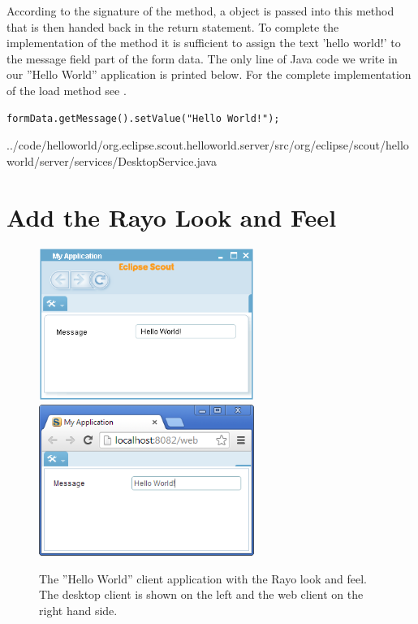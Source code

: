\documentclass[a4paper,10pt,twoside]{book}
\begin{document}
According to the signature of the  method, a  object is passed into this method that is then handed back in the return statement.
To complete the implementation of the  method it is sufficient to assign the text 'hello world!' to the message field part of the form data.
The only line of Java code we write in our ''Hello World'' application is printed below.
For the complete implementation of the load method see .

\begin{lstlisting}[backgroundcolor=\color{white}]
  formData.getMessage().setValue("Hello World!");
\end{lstlisting}


{../code/helloworld/org.eclipse.scout.helloworld.server/src/org/eclipse/scout/helloworld/server/services/DesktopService.java}

\section{Add the Rayo Look and Feel}

\begin{figure}
\includegraphics[width=7cm]{helloworld_message_swing_rayo.png} \hspace{5mm}
\includegraphics[width=7cm]{helloworld_message_rap_rayo.png}
\caption{The ''Hello World'' client application with the Rayo look and feel. The desktop client is shown on the left and the web client on the right hand side.}
\end{figure}
\end{document}
